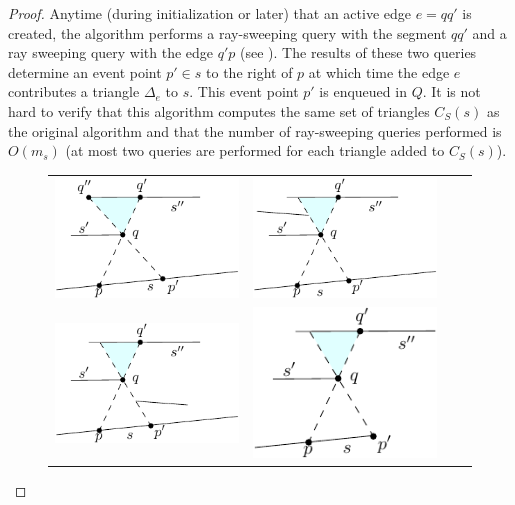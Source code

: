 \documentclass{patmorin}
\begin{document}
\begin{proof}
Anytime (during initialization or later) that an active edge $e=qq'$
is created, the algorithm performs a ray-sweeping query with the
segment $qq'$ and a ray sweeping query with the edge $q'p$ (see
).  The results of these two queries determine an event
point $p'\in s$ to the right of $p$ at which time the edge $e$ contributes
a triangle $\Delta_e$ to $s$. This event point $p'$ is enqueued in $Q$.
It is not hard to verify that this algorithm computes the same set of
triangles $C_S(s)$ as the original algorithm and that the number of
ray-sweeping queries performed is $O(m_s)$ (at most two queries are
performed for each triangle added to $C_S(s)$).

\begin{figure}
  \begin{center}
    \begin{tabular}{cccc}
    \includegraphics{ray-sweep-a} &
    \includegraphics{ray-sweep-b} \\
    \includegraphics{ray-sweep-c} &
    \includegraphics{ray-sweep-d} \\

\end{tabular}
\end{center}
\end{figure}
\end{proof}
\end{document}
